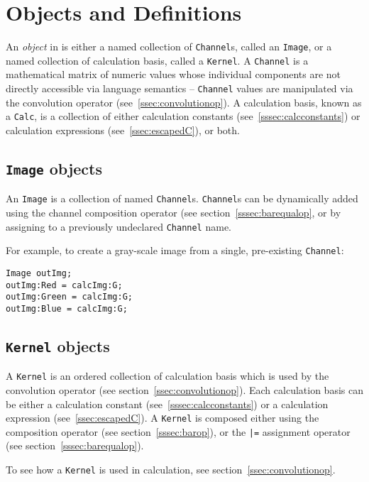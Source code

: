\section{Objects and Definitions}
\label{sec:objdef}
An \emph{object} in \sys{} is either a named collection of \texttt{Channel}s, called an
\texttt{Image}, or a named collection of calculation basis, called a
\texttt{Kernel}. A \texttt{Channel} is a mathematical matrix of numeric values
whose individual components are not directly accessible via \sys{} language
semantics -- \texttt{Channel} values are manipulated via the convolution
operator (see~\ref{ssec:convolutionop}). A calculation basis, known as a
\texttt{Calc}, is a collection of either calculation constants
(see~\ref{sssec:calcconstants}) or calculation expressions (see~\ref{ssec:escapedC}),
or both.

\subsection{\texttt{Image} objects}
\label{ssec:images}
An \texttt{Image} is a collection of named \texttt{Channel}s. \texttt{Channel}s can
be dynamically added  using the channel composition
operator (see section~\ref{sssec:barequalop}, or by assigning to a previously
undeclared \texttt{Channel} name. 

For example, to create a gray-scale image from a single, pre-existing
\texttt{Channel}:
\begin{lstlisting}[language=CLAM,escapechar=\%]
Image outImg;
outImg:Red = calcImg:G;
outImg:Green = calcImg:G;
outImg:Blue = calcImg:G;
\end{lstlisting}

\subsection{\texttt{Kernel} objects}
\label{ssec:kernels}
A \texttt{Kernel} is an ordered collection of calculation basis which is used by the convolution
operator (see section~\ref{ssec:convolutionop}). Each calculation basis can be either
a calculation constant (see~\ref{sssec:calcconstants}) or a calculation expression
(see~\ref{ssec:escapedC}). A \texttt{Kernel} is composed either using the composition
operator (see section~\ref{sssec:barop}), or the \texttt{|=} assignment operator (see section~\ref{sssec:barequalop}).

To see how a \texttt{Kernel} is used in calculation, see section~\ref{ssec:convolutionop}.
